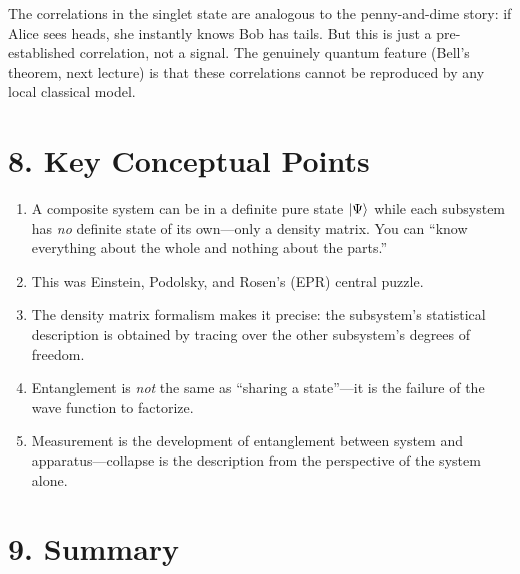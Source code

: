 \documentclass[12pt,a4paper]{article}
\begin{document}
\noindent The correlations in the singlet state are analogous to the penny-and-dime story: if Alice sees heads, she instantly knows Bob has tails.  But this is just a pre-established correlation, not a signal.  The genuinely quantum feature (Bell's theorem, next lecture) is that these correlations cannot be reproduced by any local classical model.

\section{8. Key Conceptual Points}

\begin{enumerate}[nosep]
    \item A composite system can be in a definite pure state $\ket{\Psi}$ while each subsystem has \emph{no} definite state of its own---only a density matrix.  You can ``know everything about the whole and nothing about the parts.''
    \item This was Einstein, Podolsky, and Rosen's (EPR) central puzzle.
    \item The density matrix formalism makes it precise: the subsystem's statistical description is obtained by tracing over the other subsystem's degrees of freedom.
    \item Entanglement is \emph{not} the same as ``sharing a state''---it is the failure of the wave function to factorize.
    \item Measurement is the development of entanglement between system and apparatus---collapse is the description from the perspective of the system alone.
\end{enumerate}

\section{9. Summary}
\end{document}
